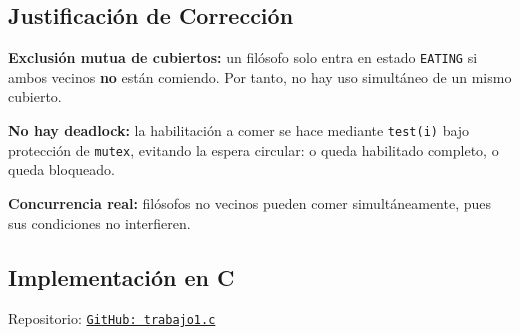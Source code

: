 \documentclass[12pt]{article}
\begin{document}
\subsection{Justificación de Corrección}
\label{subsec:correctitud}

\textbf{Exclusión mutua de cubiertos:} un filósofo solo entra en estado \texttt{EATING} si ambos vecinos \textbf{no} están comiendo. Por tanto, no hay uso simultáneo de un mismo cubierto.

\textbf{No hay deadlock:} la habilitación a comer se hace mediante \texttt{test(i)} bajo protección de \texttt{mutex}, evitando la espera circular: o queda habilitado completo, o queda bloqueado.

\textbf{Concurrencia real:} filósofos no vecinos pueden comer simultáneamente, pues sus condiciones no interfieren.

\subsection{Implementación en C}
\label{subsec:implementacion-c}

Repositorio:
\href{https://github.com/Titolin4612/PR-SistemasOperativos/blob/main/Trabajos/trabajo1/trabajo1.c}{\texttt{GitHub: trabajo1.c}}
\end{document}
